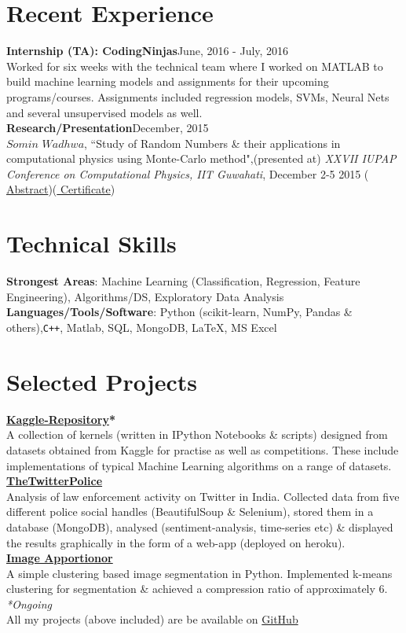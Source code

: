 \documentclass[margin,line]{res}
\begin{document}
\begin{resume}
\section{\sc Recent Experience}
{\bf Internship (TA): CodingNinjas}\hfill June, 2016 - July, 2016\\  
Worked for six weeks with the technical team where I worked on MATLAB to build machine learning models and assignments for 
their upcoming programs/courses. Assignments included regression models, SVMs, Neural Nets and several unsupervised models as well.\\
{\bf Research/Presentation}\hfill December, 2015\\  
\(Somin\) \(Wadhwa\), ``Study of Random Numbers \& their applications in computational physics using Monte-Carlo method",(presented at) {\em  XXVII IUPAP Conference on Computational Physics, IIT Guwahati}, December 2-5 2015 ({\href{https://drive.google.com/open?id=0B8hsJozmBILETlV3VVQ3S21NLTg}{\color{blue} Abstract}})({\href{https://drive.google.com/open?id=0B8hsJozmBILEcGRiT2VzZ0hFUEE}{\color{blue} Certificate}})

\section{\sc Technical Skills}
{\bf Strongest Areas}: Machine Learning (Classification, Regression, Feature Engineering), Algorithms/DS, Exploratory Data Analysis\\
{\bf Languages/Tools/Software}: Python (scikit-learn, NumPy, Pandas \& others),\texttt{C++}, Matlab, SQL, MongoDB, \LaTeX, MS Excel

\section{\sc Selected Projects}
{\bf {\href{https://github.com/sominwadhwa/Kaggle}{\color{blue} Kaggle-Repository}*}}\\
A collection of kernels (written in IPython Notebooks \& scripts) designed from datasets obtained from Kaggle for practise as well as competitions. These include implementations of typical Machine Learning algorithms on a range of datasets.\\
{\bf {\href{https://github.com/sominwadhwa/TheTwitterPolice}{\color{blue} TheTwitterPolice}}}\\
Analysis of law enforcement activity on Twitter in India. Collected data from five different police social handles (BeautifulSoup \& Selenium), stored them in a database (MongoDB), analysed (sentiment-analysis, time-series etc) \& displayed the results graphically in the form of a web-app (deployed on heroku).\\
{\bf {\href{https://github.com/sominwadhwa/Image-Apportionor}{\color{blue} Image Apportionor}}}\\
A simple clustering based image segmentation in Python. Implemented k-means clustering for segmentation \& achieved a compression ratio of approximately 6.\\
\textit{*Ongoing}\\
All my projects (above included) are be available on {\href{https://github.com/sominwadhwa}{\color{blue}GitHub}}


\end{resume}
\end{document}
